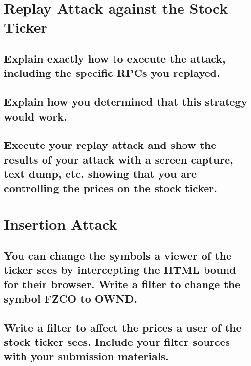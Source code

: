 \documentclass[12pt,letterpaper]{article}
\begin{document}
\section{Replay Attack against the Stock Ticker}
\subsection{Explain exactly how to execute the attack, including the specific
RPCs you replayed.}

\subsection{Explain how you determined that this strategy would work.}

\subsection{Execute your replay attack and show the results of your attack with
a screen capture, text dump, etc. showing that you are controlling the prices
on the stock ticker.}

\section{Insertion Attack}

\subsection{You can change the symbols a viewer of the ticker sees by
intercepting the HTML bound for their browser. Write a filter to change the
symbol FZCO to OWND.}

\subsection{Write a filter to affect the prices a user of the stock ticker sees.
Include your filter sources with your submission materials.}


\end{document}
